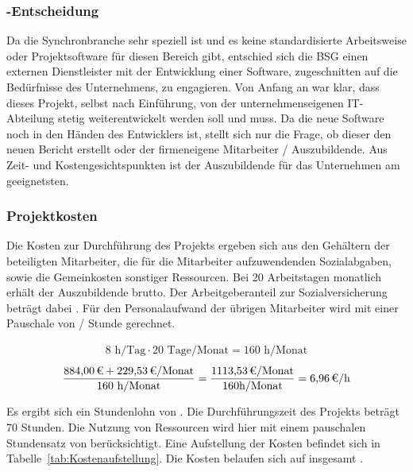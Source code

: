 \subsubsection{-Entscheidung}
\label{sec:MakeOrBuyEntscheidung}
Da die Synchronbranche sehr speziell ist und es keine standardisierte Arbeitsweise oder Projektsoftware für diesen Bereich gibt, entschied sich die \ac{BSG} einen externen Dienstleister mit der Entwicklung einer Software, zugeschnitten auf die Bedürfnisse des Unternehmens, zu engagieren. Von Anfang an war klar, dass dieses Projekt, selbst nach Einführung, von der unternehmenseigenen IT-Abteilung stetig weiterentwickelt werden soll und muss. Da die neue Software noch in den Händen des Entwicklers ist, stellt sich nur die Frage, ob dieser den neuen Bericht erstellt oder der firmeneigene Mitarbeiter / Auszubildende. Aus Zeit- und Kostengesichtspunkten ist der Auszubildende für das Unternehmen am geeignetsten. 

\subsubsection{Projektkosten}
\label{sec:Projektkosten}
Die Kosten zur Durchführung des Projekts ergeben sich aus den Gehältern der beteiligten Mitarbeiter, die für die Mitarbeiter aufzuwendenden Sozialabgaben, sowie die Gemeinkosten sonstiger Ressourcen. Bei 20 Arbeitstagen monatlich erhält der Auszubildende  brutto. Der Arbeitgeberanteil zur Sozialversicherung beträgt dabei . Für den Personalaufwand der übrigen Mitarbeiter wird mit einer Pauschale von  / Stunde gerechnet.

\begin{eqnarray}
8 \mbox{ h/Tag}  \cdot 20 \mbox{ Tage/Monat}  = 160  \mbox{ h/Monat}
\end{eqnarray}
\begin{eqnarray}
\frac{\eur{884,00} + \eur{229,53}\mbox{/Monat}}{160\mbox{ h/Monat}} = \frac{\eur{1113,53}\mbox{/Monat}}{160\mbox{h/Monat}} = \eur{6,96}\mbox{/h}
\end{eqnarray}

Es ergibt sich ein Stundenlohn von . Die Durchführungszeit des Projekts beträgt 70 Stunden. Die Nutzung von Ressourcen wird hier mit einem pauschalen Stundensatz von  berücksichtigt. Eine Aufstellung der Kosten befindet sich in Tabelle~\ref{tab:Kostenaufstellung}. Die Kosten belaufen sich auf insgesamt .

